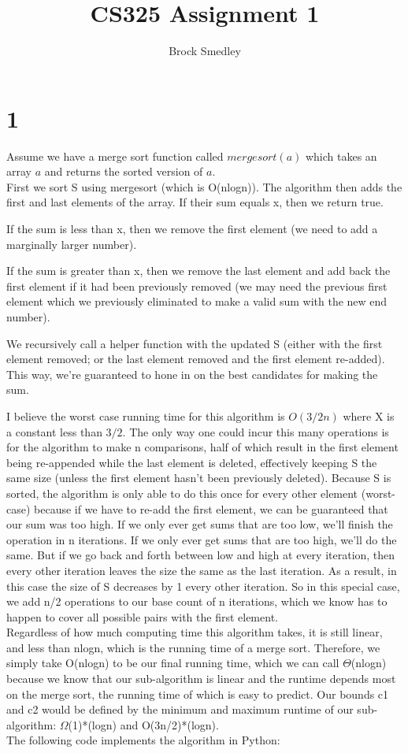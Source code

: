 \documentclass[10pt,a4paper]{report}
\author{Brock Smedley}
\title{CS325 Assignment 1}
\begin{document}
	\maketitle
	
	\section*{1}
	Assume we have a merge sort function called $mergesort(a)$ which takes an array $a$ and returns the sorted version of $a$.
	\\
	
	First we sort S using mergesort (which is O(nlogn)).
	The algorithm then adds the first and last elements of the array. If their sum equals x, then we return true. 
	
	If the sum is less than x, then we remove the first element (we need to add a marginally larger number).
	
	If the sum is greater than x, then we remove the last element and add back the first element if it had been previously removed (we may need the previous first element which we previously eliminated to make a valid sum with the new end number).
	
	We recursively call a helper function with the updated S (either with the first element removed; or the last element removed and the first element re-added).
	This way, we're guaranteed to hone in on the best candidates for making the sum.
	
	I believe the worst case running time for this algorithm is $O(3/2n)$ where X is a constant less than $3/2$. The only way one could incur this many operations is for the algorithm to make n comparisons, half of which result in the first element being re-appended while the last element is deleted, effectively keeping S the same size (unless the first element hasn't been previously deleted). Because S is sorted, the algorithm is only able to do this once for every other element (worst-case) because if we have to re-add the first element, we can be guaranteed that our sum was too high. If we only ever get sums that are too low, we'll finish the operation in n iterations. If we only ever get sums that are too high, we'll do the same. But if we go back and forth between low and high at every iteration, then every other iteration leaves the size the same as the last iteration. As a result, in this case the size of S decreases by 1 every other iteration. So in this special case, we add n/2 operations to our base count of n iterations, which we know has to happen to cover all possible pairs with the first element.
	\\
	Regardless of how much computing time this algorithm takes, it is still linear, and less than nlogn, which is the running time of a merge sort. Therefore, we simply take O(nlogn) to be our final running time, which we can call $\Theta$(nlogn) because we know that our sub-algorithm is linear and the runtime depends most on the merge sort, the running time of which is easy to predict. Our bounds c1 and c2 would be defined by the minimum and maximum runtime of our sub-algorithm: $\Omega$(1)*(logn) and O(3n/2)*(logn).
	\\
	\newpage
	The following code implements the algorithm in Python:
	
\end{document}
